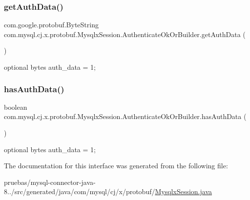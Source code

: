 \subsubsection{\texorpdfstring{get\+Auth\+Data()}{getAuthData()}}
{\footnotesize\ttfamily com.\+google.\+protobuf.\+Byte\+String com.\+mysql.\+cj.\+x.\+protobuf.\+Mysqlx\+Session.\+Authenticate\+Ok\+Or\+Builder.\+get\+Auth\+Data (\begin{DoxyParamCaption}{ }\end{DoxyParamCaption})}

{\ttfamily optional bytes auth\+\_\+data = 1;} \mbox{\label{interfacecom_1_1mysql_1_1cj_1_1x_1_1protobuf_1_1_mysqlx_session_1_1_authenticate_ok_or_builder_a4dbbd5a3164985cb661fa162414e2cb5}} 
\subsubsection{\texorpdfstring{has\+Auth\+Data()}{hasAuthData()}}
{\footnotesize\ttfamily boolean com.\+mysql.\+cj.\+x.\+protobuf.\+Mysqlx\+Session.\+Authenticate\+Ok\+Or\+Builder.\+has\+Auth\+Data (\begin{DoxyParamCaption}{ }\end{DoxyParamCaption})}

{\ttfamily optional bytes auth\+\_\+data = 1;} 

The documentation for this interface was generated from the following file\+:\begin{DoxyCompactItemize}
\item 
pruebas/mysql-\/connector-\/java-\/8../src/generated/java/com/mysql/cj/x/protobuf/\mbox{\hyperlink{generated_2java_2com_2mysql_2cj_2x_2protobuf_2_mysqlx_session_8java}{Mysqlx\+Session.\+java}}\end{DoxyCompactItemize}
